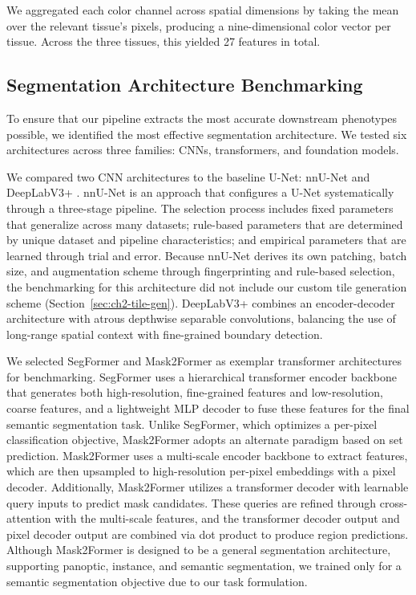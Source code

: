 We aggregated each color channel across spatial dimensions by taking the mean over the relevant tissue's pixels, producing a nine-dimensional color vector per tissue. Across the three tissues, this yielded 27 features in total.

\subsection{Segmentation Architecture Benchmarking}\label{sec:ch2-benchmark}
To ensure that our pipeline extracts the most accurate downstream phenotypes possible, we identified the most effective segmentation architecture. We tested six architectures across three families: CNNs, transformers, and foundation models.

We compared two CNN architectures to the baseline U-Net: nnU-Net \cite{isensee2021nnu} and DeepLabV3+ \cite{chen2018encoder}. nnU-Net is an approach that configures a U-Net systematically through a three-stage pipeline. The selection process includes fixed parameters that generalize across many datasets; rule-based parameters that are determined by unique dataset and pipeline characteristics; and empirical parameters that are learned through trial and error. Because nnU-Net derives its own patching, batch size, and augmentation scheme through fingerprinting and rule-based selection, the benchmarking for this architecture did not include our custom tile generation scheme (Section~\ref{sec:ch2-tile-gen}). DeepLabV3+ combines an encoder-decoder architecture with atrous depthwise separable convolutions, balancing the use of long-range spatial context with fine-grained boundary detection.

We selected SegFormer \cite{xie2021segformer} and Mask2Former \cite{cheng2022masked} as exemplar transformer architectures for benchmarking. SegFormer uses a hierarchical transformer encoder backbone that generates both high-resolution, fine-grained features and low-resolution, coarse features, and a lightweight MLP decoder to fuse these features for the final semantic segmentation task. Unlike SegFormer, which optimizes a per-pixel classification objective, Mask2Former adopts an alternate paradigm based on set prediction. Mask2Former uses a multi-scale encoder backbone to extract features, which are then upsampled to high-resolution per-pixel embeddings with a pixel decoder. Additionally, Mask2Former utilizes a transformer decoder with learnable query inputs to predict mask candidates. These queries are refined through cross-attention with the multi-scale features, and the transformer decoder output and pixel decoder output are combined via dot product to produce region predictions. Although Mask2Former is designed to be a general segmentation architecture, supporting panoptic, instance, and semantic segmentation, we trained only for a semantic segmentation objective due to our task formulation.

